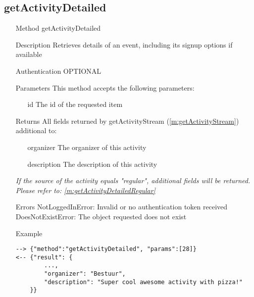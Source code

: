 \documentclass[a4paper]{scrreprt}
\begin{document}
\clearpage
\subsection{getActivityDetailed}\label{m:getActivityDetailed}
\begin{enumerate}
\item[Method] getActivityDetailed
\item[Description] Retrieves details of an event, including its signup options if available
\item[Authentication] OPTIONAL
\item[Parameters] This method accepts the following parameters:
\begin{enumerate}
	\item[id] The id of the requested item
    \end{enumerate}
\item[Returns] All fields returned by getActivityStream (\autoref{m:getActivityStream}) additional to:
\begin{enumerate}
    \item[organizer] The organizer of this activity
    \item[description] The description of this activity
    \end{enumerate}
\item[] \textit{If the source of the activity equals "regular", additional fields will be returned.\\Please refer to: \autoref{m:getActivityDetailedRegular}}

\item[Errors]
    NotLoggedInError: Invalid or no authentication token received \\
    DoesNotExistError: The object requested does not exist
\item[Example]
\begin{lstlisting}
--> {"method":"getActivityDetailed", "params":[28]}
<-- {"result": {
        ...,
        "organizer": "Bestuur",
        "description": "Super cool awesome activity with pizza!"
    }}
\end{lstlisting}
\end{enumerate}


\clearpage
\end{document}
